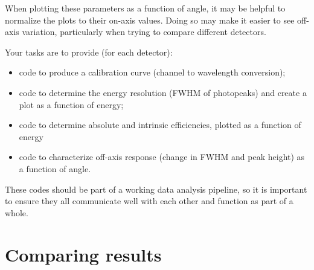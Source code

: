\documentclass{tufte-book}
\begin{document}
When plotting these parameters as a function of angle, it may be helpful to normalize the plots to their on-axis values. Doing so may make it easier to see off-axis variation, particularly when trying to compare different detectors.

\begin{tcolorbox}[sharp corners=all, colback=white!75!green, title=Primary Summary]

Your tasks are to provide (for each detector):
\begin{itemize}
\item code to produce a calibration curve (channel to wavelength conversion);
\item code to determine the energy resolution (FWHM of photopeaks) and create a plot as a function of energy;
\item code to determine absolute and intrinsic efficiencies, plotted as a function of energy
\item code to characterize off-axis response (change in FWHM and peak height) as a function of angle.
\end{itemize}

These codes should be part of a working data analysis pipeline, so it is important to ensure they all communicate well with each other and function as part of a whole.

\end{tcolorbox} 





\section{Comparing results}
\label{sec:he-compare-results}
\end{document}
